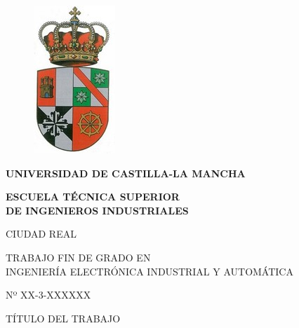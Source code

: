 

\pagestyle{empty}       %

\begin{center}
	\vspace*{-35mm}
	\begin{figure}[htbp]
		\centering
    	\includegraphics[scale=0.85]{portada/uclm_to.jpg}     %
	\end{figure}
\end{center}

\begin{center}
 \LARGE{\bf{UNIVERSIDAD DE CASTILLA-LA MANCHA}}
\end{center}
\vspace{2mm}
\begin{center}
 \LARGE{\bf{ESCUELA TÉCNICA SUPERIOR \\ DE INGENIEROS INDUSTRIALES}}
\end{center}

\begin{center}
 \Large{CIUDAD REAL}
\end{center}

\vspace{2mm}

\begin{center}
	\Large{TRABAJO FIN DE GRADO EN \\ INGENIERÍA ELECTRÓNICA INDUSTRIAL Y AUTOMÁTICA}
\end{center}

\begin{center}
 \LARGE{Nº XX-3-XXXXXX}
\end{center}

\vspace{2mm}

\begin{center}
 \LARGE{TÍTULO DEL TRABAJO}
\end{center}

